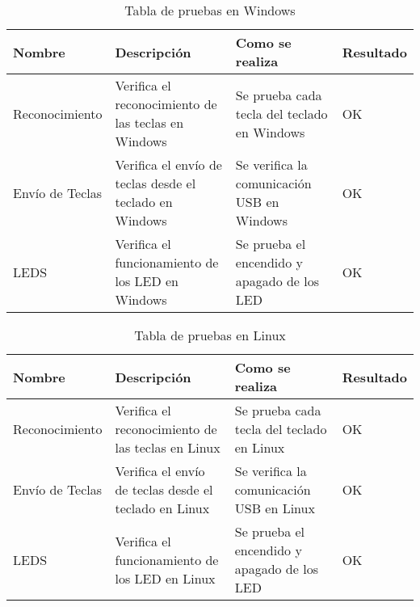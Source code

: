 \begin{table}[!htb]
\small
\begin{tabular}{|l|p{3cm}|p{3.5cm}|l|}
\hline
Nombre           & Descripción                                               & Como se realiza                                    & Resultado \\ \hline
Reconocimiento   & Verifica el reconocimiento de las teclas en \gls{Windows}        & Se prueba cada tecla del teclado en \gls{Windows}        & OK         \\ \hline
Envío de Teclas  & Verifica el envío de teclas desde el teclado en \gls{Windows}    & Se verifica la comunicación USB en \gls{Windows}         & OK         \\ \hline
\gls{LED}S             & Verifica el funcionamiento de los \gls{LED} en \gls{Windows}           & Se prueba el encendido y apagado de los \gls{LED}        & OK         \\ \hline
\end{tabular}
\caption{Tabla de pruebas en \gls{Windows}}
\label{Table:PruebaSistemaWindows}
\end{table}

\phantom{Espacio}
\begin{table}[!htb]
\small
\begin{tabular}{|l|p{3cm}|p{3.5cm}|l|}
\hline
Nombre           & Descripción                                               & Como se realiza                                    & Resultado \\ \hline
Reconocimiento   & Verifica el reconocimiento de las teclas en \gls{Linux}        & Se prueba cada tecla del teclado en \gls{Linux}        & OK         \\ \hline
Envío de Teclas  & Verifica el envío de teclas desde el teclado en \gls{Linux}    & Se verifica la comunicación USB en \gls{Linux}         & OK         \\ \hline
\gls{LED}S             & Verifica el funcionamiento de los \gls{LED} en \gls{Linux}           & Se prueba el encendido y apagado de los \gls{LED}        & OK         \\ \hline
\end{tabular}
\caption{Tabla de pruebas en \gls{Linux}}
\label{Table:PruebaSistemaLinux}
\end{table}
    